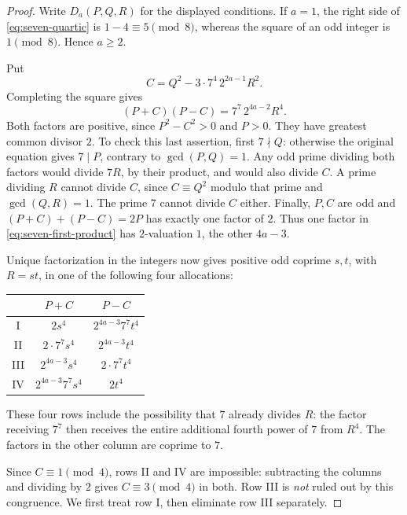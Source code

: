 \begin{proof}
Write $D_a(P,Q,R)$ for the displayed conditions.  If $a=1$, the right side of
\eqref{eq:seven-quartic} is $1-4\equiv5\pmod8$, whereas the square of an odd
integer is $1\pmod8$.  Hence $a\geq2$.

Put
\[
 C=Q^2-3\cdot7^4\,2^{2a-1}R^2.
\]
Completing the square gives
\begin{equation}\label{eq:seven-first-product}
 (P+C)(P-C)=7^7\,2^{4a-2}R^4.
\end{equation}
Both factors are positive, since $P^2-C^2>0$ and $P>0$.  They have greatest
common divisor $2$.  To check this last assertion, first $7\nmid Q$: otherwise
the original equation gives $7\mid P$, contrary to $\gcd(P,Q)=1$.  Any odd
prime dividing both factors would divide $7R$, by their product, and would
also divide $C$.  A prime dividing $R$ cannot divide $C$, since
$C\equiv Q^2$ modulo that prime and $\gcd(Q,R)=1$.  The prime $7$ cannot divide
$C$ either.  Finally, $P,C$ are odd and $(P+C)+(P-C)=2P$ has exactly one factor
of $2$.  Thus one factor in \eqref{eq:seven-first-product} has $2$-valuation
$1$, the other $4a-3$.

Unique factorization in the integers now gives positive odd coprime $s,t$,
with $R=st$, in one of the following four allocations:
\begin{center}
\begin{tabular}{c|cc}
 & $P+C$ & $P-C$ \\
\hline
I   & $2s^4$ & $2^{4a-3}7^7t^4$ \\
II  & $2\cdot7^7s^4$ & $2^{4a-3}t^4$ \\
III & $2^{4a-3}s^4$ & $2\cdot7^7t^4$ \\
IV  & $2^{4a-3}7^7s^4$ & $2t^4$
\end{tabular}
\end{center}
These four rows include the possibility that $7$ already divides $R$:
the factor receiving $7^7$ then receives the entire additional fourth power
of $7$ from $R^4$.  The factors in the other column are coprime to $7$.

Since $C\equiv1\pmod4$, rows II and IV are impossible: subtracting the
columns and dividing by $2$ gives $C\equiv3\pmod4$ in both.  Row III is
\emph{not} ruled out by this congruence.  We first treat row I, then eliminate
row III separately.


\end{proof}
